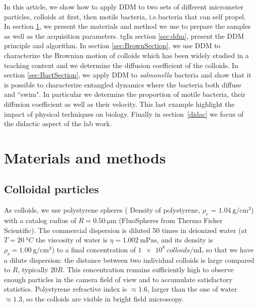 \documentclass[%
 aip,
 jmp,%
 amsmath,amssymb,
reprint,%
]{revtex4-1}
\newcommand{\tg}[1]{{\color{magenta}#1}} %
\begin{document}
In this article, we show how to apply DDM to two sets of different micrometer particles, colloids at first, then motile bacteria, \tg{i.e.bacteria that can self propel}. In section \ref{materials}, we present the materials and method we use to prepare the samples as well as the acquisition parameters. tg{In section \ref{sec:ddm}, present the DDM principle and algorithm}. In section \ref{sec:BrownSection}, we \tg{use DDM to characterize the Brownian motion of colloids which has been widely studied in a teaching context and we determine the diffusion coefficient of the colloids}. In section \ref{sec:BactSection}, we apply DDM to \textit{salmonella} bacteria and show that it is possible to characterize entangled dynamics where the bacteria both diffuse and ``swim". \tg{In particular we determine the proportion of motile bacteria, their diffusion coefficient as well as their velocity}. This last example highlight the impact of physical techniques on biology. Finally in section~\ref{didac} we focus of the didactic aspect of the lab work.

\section{Materials and methods}
\label{materials}
\subsection{Colloidal particles}

As colloids, we use polystyrene spheres ( Density of polystyrene, $\rho_\text{c}$ = $\SI{1.04}{\gram\per\centi\meter\cubed}$) with a catalog radius of $R=\SI{0.50}{\micro\meter}$  (FluoSpheres\circledR{} from Thermo Fisher Scientific). The commercial dispersion is diluted 50 times in \tg{deionized} water \tg{(at $T=\SI{20}{\degree C}$ the viscosity of water is $\eta =\SI{1.002}{\milli\pascal\second}$, and its density is $\rho_\text{s}=\SI{1.00}{\gram\per\centi\meter\cubed}$)} to a final concentration of $\SI{1e8}{colloids\per\milli\liter}$ so that we have a dilute dispersion: \tg{the distance between two individual colloids} is large compared to $R$, typically $20 R$. This concentration remains sufficiently high to observe enough particles in the camera field of view and to \tg{accumulate satisfactory statistics}. Polystyrene refractive index is $\approx 1.6$, larger than the one of water $\approx 1.3$, so the colloids are visible in bright field microscopy.
\end{document}
